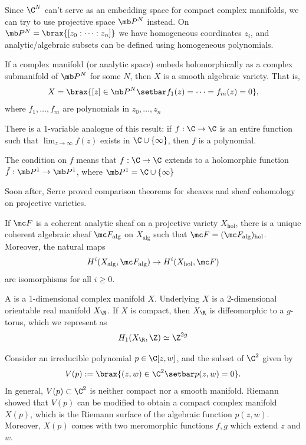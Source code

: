 \documentclass[11pt]{report}
\begin{document}
Since $\C^N$ can't serve as an embedding space for compact complex manifolds, we can try to use projective space $\mb P^N$ instead. On $\mb P^N = \brax{[z_0:\cdots :z_n]}$ we have homogeneous coordinates $z_i$, and analytic/algebraic subsets can be defined using homogeneous polynomials.

\begin{thm}
    If a complex manifold (or analytic space) embeds holomorphically as a complex submanifold of $\mb P^N$ for some $N$, then $X$ is a smooth algebraic variety. That is,
    $$X = \brax{ [z] \in \mb P^N \setbar f_1(z) =\cdots = f_m(z) = 0},$$
    where $f_1,\dots,f_m$ are polynomials in $z_0,\dots,z_n$
\end{thm}

\begin{rmk}
    There is a 1-variable analogue of this result: if $f:\C \to \C$ is an entire function such that $\lim_{z \to \infty}f(z)$ exists in $\C \cup \{\infty\}$, then $f$ is a polynomial.

    The condition on $f$ means that $f:\C \to \C$ extends to a holomorphic function $\tilde f:\mb P^1 \to \mb P^1$, where $\mb P^1 = \C \cup \{\infty\}$
\end{rmk}

Soon after, Serre proved comparison theorems for sheaves and sheaf cohomology on projective varieties.

\begin{thm}
    If $\mc F$ is a coherent analytic sheaf on a projective variety $X_{\text{hol}}$, there is a unique coherent algebraic sheaf $\mc F_{\text{alg}}$ on $X_{\text{alg}}$ such that $\mc F = (\mc F_{\text{alg}})_{\text{hol}}$. Moreover, the natural maps
    $$H^{i}(X_{\text{alg}}, \mc F_{\text{alg}}) \to H^i(X_{\text{hol}},\mc F)$$
    are isomorphisms for all $i \geq 0$.
\end{thm}

\begin{defn}
    A  is a 1-dimensional complex manifold $X$. Underlying $X$ is a 2-dimensional orientable real manifold $X_\R$. If $X$ is compact, then $X_\R$ is diffeomorphic to a $g$-torus, which we represent as
    $$H_1(X_\R, \Z) \simeq \Z^{2g}$$
\end{defn}

Consider an irreducible polynomial $p \in \C[z,w]$, and the subset of $\C^2$ given by
$$V(p):= \brax{(z,w) \in \C^2 \setbar p(z,w) =0}.$$
In general, $V(p) \subset \C^2$ is neither compact nor a smooth manifold. Riemann showed that $V(p)$ can be modified to obtain a compact complex manifold $X(p)$, which is the Riemann surface of the algebraic function $p(z,w)$. Moreover, $X(p)$ comes with two meromorphic functions $f,g$ which extend $z$ and $w$.
\end{document}
